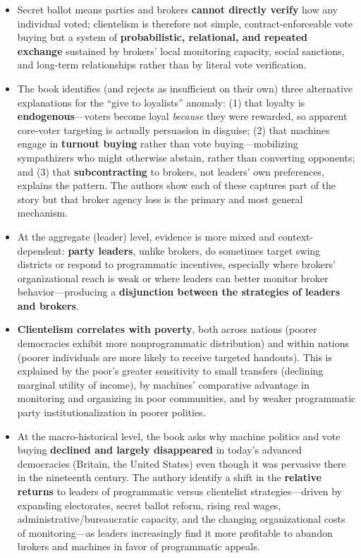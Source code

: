 \documentclass[12pt]{article}
\begin{document}
\begin{itemize}[leftmargin=*, itemsep=4pt]
    \item Secret ballot means parties and brokers \textbf{cannot directly verify} how any individual voted; clientelism is therefore not simple, contract-enforceable vote buying but a system of \textbf{probabilistic, relational, and repeated exchange} sustained by brokers' local monitoring capacity, social sanctions, and long-term relationships rather than by literal vote verification.
    \item The book identifies (and rejects as insufficient on their own) three alternative explanations for the ``give to loyalists'' anomaly: (1) that loyalty is \textbf{endogenous}---voters become loyal \emph{because} they were rewarded, so apparent core-voter targeting is actually persuasion in disguise; (2) that machines engage in \textbf{turnout buying} rather than vote buying---mobilizing sympathizers who might otherwise abstain, rather than converting opponents; and (3) that \textbf{subcontracting} to brokers, not leaders' own preferences, explains the pattern. The authors show each of these captures part of the story but that broker agency loss is the primary and most general mechanism.
    \item At the aggregate (leader) level, evidence is more mixed and context-dependent: \textbf{party leaders}, unlike brokers, do sometimes target swing districts or respond to programmatic incentives, especially where brokers' organizational reach is weak or where leaders can better monitor broker behavior---producing a \textbf{disjunction between the strategies of leaders and brokers}.
    \item \textbf{Clientelism correlates with poverty}, both across nations (poorer democracies exhibit more nonprogrammatic distribution) and within nations (poorer individuals are more likely to receive targeted handouts). This is explained by the poor's greater sensitivity to small transfers (declining marginal utility of income), by machines' comparative advantage in monitoring and organizing in poor communities, and by weaker programmatic party institutionalization in poorer polities.
    \item At the macro-historical level, the book asks why machine politics and vote buying \textbf{declined and largely disappeared} in today's advanced democracies (Britain, the United States) even though it was pervasive there in the nineteenth century. The authory identify a shift in the \textbf{relative returns} to leaders of programmatic versus clientelist strategies---driven by expanding electorates, secret ballot reform, rising real wages, administrative/bureaucratic capacity, and the changing organizational costs of monitoring---as leaders increasingly find it more profitable to abandon brokers and machines in favor of programmatic appeals.

\end{itemize}
\end{document}
